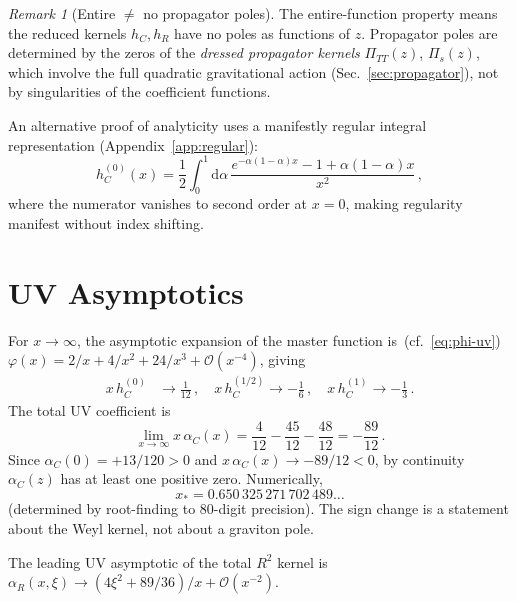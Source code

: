 \documentclass[aps,prd,twocolumn,superscriptaddress,nofootinbib,floatfix]{revtex4-2}
\theoremstyle{definition}
\theoremstyle{remark}
\newtheorem{remark}[theorem]{Remark}
\newcommand{\dd}{\mathrm{d}}
\begin{document}
\begin{remark}[Entire $\neq$ no propagator poles]
\label{rem:poles}
The entire-function property means the reduced kernels $h_C, h_R$ have no
poles as functions of $z$. Propagator poles are determined by the zeros of
the \emph{dressed propagator kernels} $\Pi_{TT}(z)$, $\Pi_s(z)$, which
involve the full quadratic gravitational action (Sec.~\ref{sec:propagator}),
not by singularities of the coefficient functions.
\end{remark}

An alternative proof of analyticity uses a manifestly regular integral
representation (Appendix~\ref{app:regular}):
\begin{equation}
  h_C^{(0)}(x) = \frac{1}{2}\int_0^1 \dd\alpha\,
    \frac{e^{-\alpha(1-\alpha)x} - 1 + \alpha(1-\alpha)x}{x^2}\,,
  \label{eq:hC0-regular}
\end{equation}
where the numerator vanishes to second order at $x = 0$, making regularity
manifest without index shifting.


\section{UV Asymptotics}
\label{sec:uv}

For $x \to \infty$, the asymptotic expansion of the master function
is~(cf.~\eqref{eq:phi-uv})
$\varphi(x) = 2/x + 4/x^2 + 24/x^3 + \mathcal{O}(x^{-4})$, giving
\begin{align}
  x\,h_C^{(0)} &\to \frac{1}{12}\,,\quad
  x\,h_C^{(1/2)} \to -\frac{1}{6}\,,\quad
  x\,h_C^{(1)} \to -\frac{1}{3}\,.
\end{align}
The total UV coefficient is
\begin{equation}
  \lim_{x\to\infty} x\,\alpha_C(x)
    = \frac{4}{12} - \frac{45}{12} - \frac{48}{12}
    = -\frac{89}{12}\,.
  \label{eq:uv-coeff}
\end{equation}
Since $\alpha_C(0) = +13/120 > 0$ and $x\,\alpha_C(x) \to -89/12 < 0$, by
continuity $\alpha_C(z)$ has at least one positive zero. Numerically,
\begin{equation}
  x_\ast = 0.650\,325\,271\,702\,489\ldots
  \label{eq:xstar}
\end{equation}
(determined by root-finding to $80$-digit precision). The sign change is a
statement about the Weyl kernel, not about a graviton pole.

The leading UV asymptotic of the total $R^2$ kernel is
$\alpha_R(x,\xi) \to (4\xi^2 + 89/36)/x + \mathcal{O}(x^{-2})$.
\end{document}
